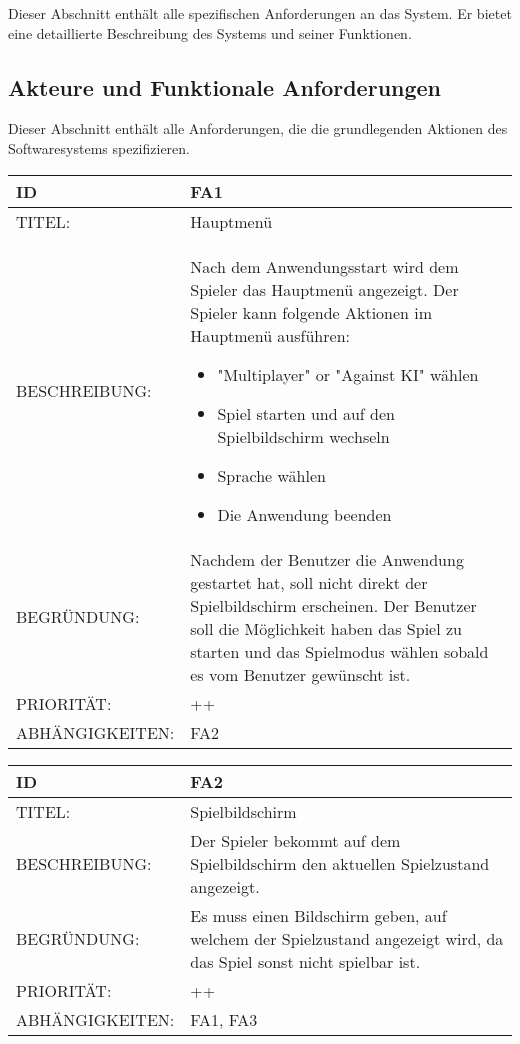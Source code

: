 \documentclass{uulm-assignment}
\begin{document}
    Dieser Abschnitt enthält alle spezifischen Anforderungen an das System. Er bietet eine detaillierte Beschreibung des Systems und seiner Funktionen.

    \subsection{Akteure und Funktionale Anforderungen}

    Dieser Abschnitt enthält alle Anforderungen, die die grundlegenden Aktionen des Softwaresystems spezifizieren.

    \begin{tabularx}{\textwidth}{|l|X |} \hline
        \textbf{ID} & \textbf{FA1} \\
        \hline
        TITEL: & Hauptmenü \\
        \hline
        BESCHREIBUNG: & Nach dem Anwendungsstart wird dem Spieler das Hauptmenü angezeigt. Der Spieler kann folgende Aktionen im Hauptmenü ausführen:
        \begin{itemize}
            \item "Multiplayer" or "Against KI" wählen
            \item Spiel starten und auf den Spielbildschirm wechseln
            \item Sprache wählen 
            \item Die Anwendung beenden
        \end{itemize}
        \\
        \hline
        BEGRÜNDUNG: & Nachdem der Benutzer die Anwendung gestartet hat, soll nicht direkt der Spielbildschirm erscheinen.
        Der Benutzer soll die Möglichkeit haben das Spiel zu starten und das Spielmodus wählen sobald es vom Benutzer gewünscht ist.\\
        \hline
        PRIORITÄT: & ++ \\
        \hline
        ABHÄNGIGKEITEN: & FA2\\
        \hline        
    \end{tabularx}

    \begin{tabularx}{\textwidth}{|l|X |} \hline
        \textbf{ID} & \textbf{FA2} \\
        \hline
        TITEL: & Spielbildschirm \\
        \hline
        BESCHREIBUNG: & Der Spieler bekommt auf dem Spielbildschirm den aktuellen Spielzustand angezeigt.
        \\
        \hline
        BEGRÜNDUNG: & Es muss einen Bildschirm geben, auf welchem der Spielzustand angezeigt wird, da das Spiel
        sonst nicht spielbar ist. \\
        \hline
        PRIORITÄT: & ++ \\
        \hline
        ABHÄNGIGKEITEN: & FA1, FA3\\
        \hline
    \end{tabularx}
\end{document}

